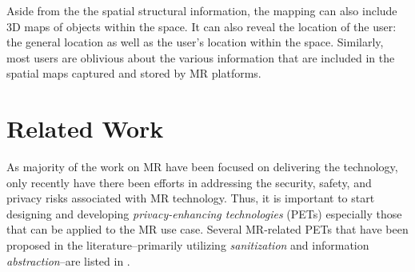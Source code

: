 
Aside from the the spatial structural information, the mapping can also include 3D maps of objects within the space. It can also reveal the location of the user: the general location as well as the user's location within the space. Similarly, most users are oblivious about the various information that are included in the spatial maps captured and stored by MR platforms.

\section{Related Work}\label{sec:related-work}

As majority of the work on MR have been focused on delivering the technology, only recently have there been efforts in addressing the security, safety, and privacy risks associated with MR technology. Thus, it is important to start designing and developing \textit{privacy-enhancing technologies} (PETs) especially those that can be applied to the MR use case. Several MR-related PETs that have been proposed in the literature--primarily utilizing \textit{sanitization} and information \textit{abstraction}--are listed in \cite{deguzman2018security}. %


